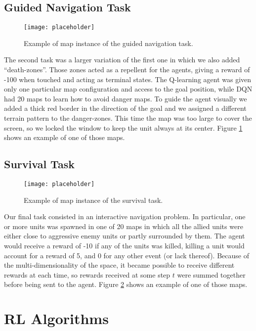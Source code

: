 \subsection{Guided Navigation Task}

\begin{figure}[h]
    \centering
    \texttt{[image: placeholder]}
    \caption{Example of map instance of the guided navigation task.}
    \label{fig:guid_task}
\end{figure}

The second task was a larger variation of the first one in which we also added
``death-zones''. Those zones acted as a repellent for the agents, giving a
reward of -100 when touched and acting as terminal states. The Q-learning agent
was given only one particular map configuration and access to the goal position,
while DQN had 20 maps to learn how to avoid danger maps. To guide the agent
visually we added a thick red border in the direction of the goal and we
assigned a different terrain pattern to the danger-zones. This time the map was
too large to cover the screen, so we locked the window to keep the unit always
at its center. Figure \ref{fig:guid_task} shows an example of one of those maps.

\subsection{Survival Task}

\begin{figure}[h]
    \centering
    \texttt{[image: placeholder]}
    \caption{Example of map instance of the survival task.}
    \label{fig:surv_task}
\end{figure}

Our final task consisted in an interactive navigation problem. In particular,
one or more units was spawned in one of 20 maps in which all the allied units
were either close to aggressive enemy units or partly surrounded by them.
The agent would receive a reward of -10 if any of the units was killed, killing
a unit would account for a reward of 5, and 0 for any other event (or lack
thereof). Because of the multi-dimensionality of the space, it became possible
to receive different rewards at each time, so rewards received at some step $t$
were summed together before being sent to the agent. Figure \ref{fig:surv_task}
shows an example of one of those maps.

\section{RL Algorithms}

